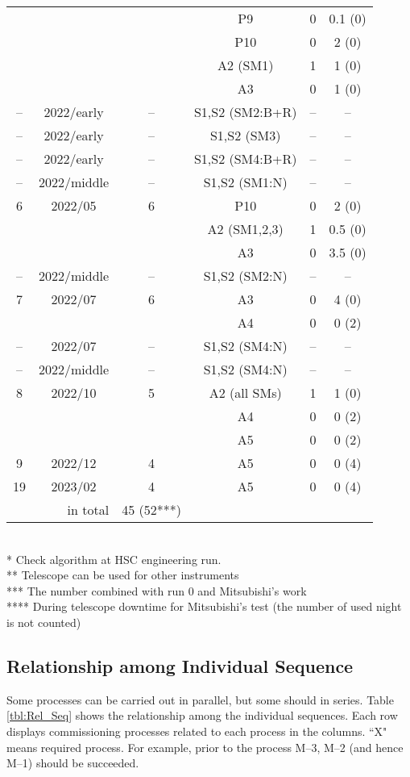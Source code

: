 {\begin{table}[!ht]
\begin{center}
\begin{tabular}{*{3}{c}|*{3}{c}}
	&	&					& P9  			& 0 	& 0.1 (0)	\\
	&	&					& P10  			& 0 	& 2 (0)	\\
	&	&					& A2 (SM1)	& 1 	& 1 (0)	\\ 
	&	&					& A3 			& 0 	& 1 (0)	\\ \hline
--	& 2022/early			& --		& S1,S2 (SM2:B+R)		& --		& --	\\ 
--	& 2022/early			& --		& S1,S2 (SM3)		& --		& --	\\ 
--	& 2022/early			& --		& S1,S2 (SM4:B+R)		& --		& --	\\
--	& 2022/middle			& --		& S1,S2 (SM1:N)		& --		& --	\\ \hline
6	& 2022/05	& 6 		& P10 			& 0 	& 2 (0)	\\
	&	&					& A2 (SM1,2,3)	& 1 	& 0.5 (0)	\\
	&	&					& A3 			& 0 	& 3.5 (0)	\\ \hline
--	& 2022/middle			& --		& S1,S2 (SM2:N)		& --		& --	\\ \hline
7	& 2022/07	& 6					& A3			& 0		& 4 (0)	\\
	&	&					& A4			& 0		& 0 (2)	\\ \hline
--	& 2022/07			& --		& S1,S2 (SM4:N)		& --		& --	\\ \hline
--	& 2022/middle			& --		& S1,S2 (SM4:N)		& --		& --	\\ \hline
8	& 2022/10	& 5			& A2 (all SMs)	& 1 	& 1 (0)	\\
	&	&					& A4			& 0		& 0	(2)	\\
	&	&					& A5			& 0		& 0 (2)	\\ \hline
9	& 2022/12	& 4			& A5			& 0		& 0 (4)	\\ \hline
19	& 2023/02	& 4			& A5			& 0		& 0 (4)	\\ \hline \hline
\multicolumn{2}{r}{in total}& 45 (52***) \\ \hline
\end{tabular}
\\
* Check algorithm at HSC engineering run. \\
** Telescope can be used for other instruments \\
*** The number combined with run 0 and Mitsubishi's work \\
**** During telescope downtime for Mitsubishi's test (the number of used night is not counted)
\end{center}
\end{table}

\clearpage

\subsection{Relationship among Individual Sequence}
Some processes can be carried out in parallel, but some should in series.
Table \ref{tbl:Rel_Seq} shows the relationship among the individual sequences.
Each row displays commissioning processes related to each process in the columns.
``X" means required process.
For example, prior to the process M--3, M--2 (and hence M--1) should be succeeded.

}
